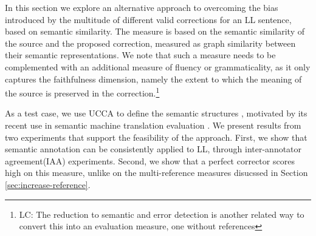 \documentclass[letter,11pt]{article}
\newcommand{\lc}[1]{\footnote{\color{green}LC: #1}}
\begin{document}
In this section we explore an alternative approach to overcoming the bias
introduced by the multitude of different valid corrections for an LL sentence, based
on semantic similarity.
The measure is based on the semantic similarity of the source and the proposed correction,
measured as graph similarity between their semantic representations.
We note that such a measure needs to be complemented with an additional
measure of fluency or grammaticality\cite{sakaguchi2016reassessing}, as it only captures
the faithfulness dimension, namely the extent to which
the meaning of the source is preserved in the correction.\lc{The reduction to semantic and error detection is another related way to convert this into an evaluation measure, one without references}

As a test case, we use UCCA to define the semantic structures \cite{abend2013universal}, motivated by
its recent use in semantic machine translation evaluation \cite{birch2016hume}.
We present results from two experiments that support the feasibility of the approach.
First, we show that semantic annotation can be consistently applied to LL,
through inter-annotator agreement(IAA) experiments.
Second, we show that a perfect corrector scores high on this measure, unlike on
the multi-reference measures disucssed in Section \ref{sec:increase-reference}.



\end{document}
